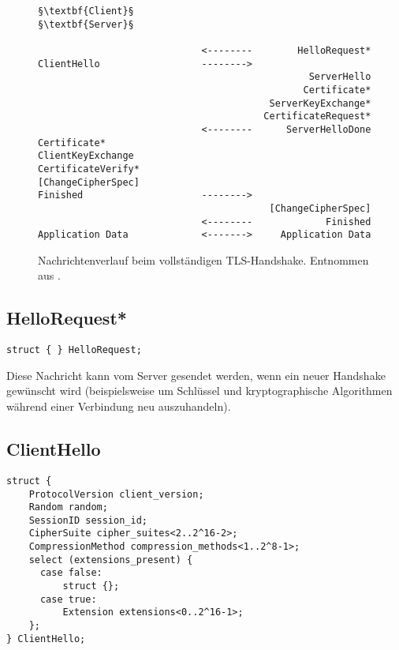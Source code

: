 \lstset{
	style=default,
	frame=single
}
\begin{figure}[H]
	\centering
	\begin{lstlisting}
§\textbf{Client}§                                               §\textbf{Server}§

                             <--------        HelloRequest*
ClientHello                  -------->
                                                ServerHello
                                               Certificate*
                                         ServerKeyExchange*
                                        CertificateRequest*
                             <--------      ServerHelloDone
Certificate*
ClientKeyExchange
CertificateVerify*
[ChangeCipherSpec]
Finished                     -------->
                                         [ChangeCipherSpec]
                             <--------             Finished
Application Data             <------->     Application Data
	\end{lstlisting}
	\caption{Nachrichtenverlauf beim vollständigen TLS-Handshake. Entnommen aus \cite{tls12}.}
	\label{fig_complete_handshake}
\end{figure}
\lstset{style=tls}

\subsection{HelloRequest*}

\begin{lstlisting}
struct { } HelloRequest;
\end{lstlisting}

Diese Nachricht kann vom Server gesendet werden, wenn ein neuer Handshake gewünscht wird (beispielsweise um Schlüssel und kryptographische Algorithmen während einer Verbindung neu auszuhandeln).

\subsection{ClientHello}

\begin{lstlisting}
struct {
	ProtocolVersion client_version;
	Random random;
	SessionID session_id;
	CipherSuite cipher_suites<2..2^16-2>;
	CompressionMethod compression_methods<1..2^8-1>;
	select (extensions_present) {
	  case false:
	      struct {};
	  case true:
	      Extension extensions<0..2^16-1>;
	};
} ClientHello;
\end{lstlisting}

